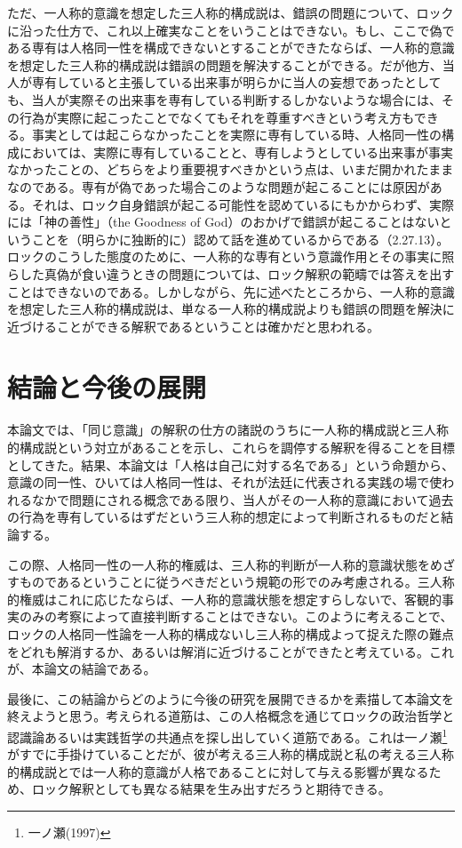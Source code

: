 \documentclass[a4j,oneside]{jsbook}
\begin{document}
ただ、一人称的意識を想定した三人称的構成説は、錯誤の問題について、ロックに沿った仕方で、これ以上確実なことをいうことはできない。もし、ここで偽である専有は人格同一性を構成できないとすることができたならば、一人称的意識を想定した三人称的構成説は錯誤の問題を解決することができる。だが他方、当人が専有していると主張している出来事が明らかに当人の妄想であったとしても、当人が実際その出来事を専有している判断するしかないような場合には、その行為が実際に起こったことでなくてもそれを尊重すべきという考え方もできる。事実としては起こらなかったことを実際に専有している時、人格同一性の構成においては、実際に専有していることと、専有しようとしている出来事が事実なかったことの、どちらをより重要視すべきかという点は、いまだ開かれたままなのである。専有が偽であった場合このような問題が起こることには原因がある。それは、ロック自身錯誤が起こる可能性を認めているにもかからわず、実際には「神の善性」（the Goodness of God）のおかげで錯誤が起こることはないということを（明らかに独断的に）認めて話を進めているからである（2.27.13）。ロックのこうした態度のために、一人称的な専有という意識作用とその事実に照らした真偽が食い違うときの問題については、ロック解釈の範疇では答えを出すことはできないのである。しかしながら、先に述べたところから、一人称的意識を想定した三人称的構成説は、単なる一人称的構成説よりも錯誤の問題を解決に近づけることができる解釈であるということは確かだと思われる。
\newpage
\chapter*{
結論と今後の展開
}
本論文では、「同じ意識」の解釈の仕方の諸説のうちに一人称的構成説と三人称的構成説という対立があることを示し、これらを調停する解釈を得ることを目標としてきた。結果、本論文は「人格は自己に対する名である」という命題から、意識の同一性、ひいては人格同一性は、それが法廷に代表される実践の場で使われるなかで問題にされる概念である限り、当人がその一人称的意識において過去の行為を専有しているはずだという三人称的想定によって判断されるものだと結論する。
\par
この際、人格同一性の一人称的権威は、三人称的判断が一人称的意識状態をめざすものであるということに従うべきだという規範の形でのみ考慮される。三人称的権威はこれに応じたならば、一人称的意識状態を想定すらしないで、客観的事実のみの考察によって直接判断することはできない。このように考えることで、ロックの人格同一性論を一人称的構成ないし三人称的構成よって捉えた際の難点をどれも解消するか、あるいは解消に近づけることができたと考えている。これが、本論文の結論である。
\par
最後に、この結論からどのように今後の研究を展開できるかを素描して本論文を終えようと思う。考えられる道筋は、この人格概念を通じてロックの政治哲学と認識論あるいは実践哲学の共通点を探し出していく道筋である。これは一ノ瀬\footnote{一ノ瀬(1997)}がすでに手掛けていることだが、彼が考える三人称的構成説と私の考える三人称的構成説とでは一人称的意識が人格であることに対して与える影響が異なるため、ロック解釈としても異なる結果を生み出すだろうと期待できる。
\end{document}
